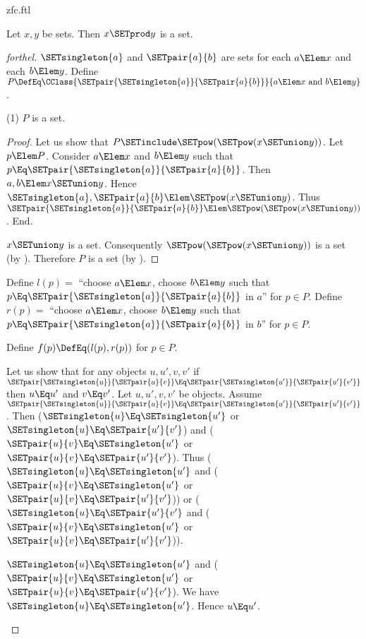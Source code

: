 \documentclass{stex}
\begin{document}
\begin{smodule}{zfc.ftl}
\begin{proposition}[forthel]
  Let $x, y$ be sets.
  Then $x \SETprod y$ is a set.
\end{proposition}
\begin{proof}[forthel]
  $\SETsingleton{a}$ and $\SETpair{a}{b}$ are sets for each $a \Elem x$ and each $b \Elem y$.
  Define $P \DefEq \CClass{\SETpair{\SETsingleton{a}}{\SETpair{a}{b}}}{a \Elem x\text{ and }b \Elem y}$.

  (1) $P$ is a set.
  \begin{proof}
    Let us show that $P \SETinclude \SETpow(\SETpow(x \SETunion y))$.
      Let $p \Elem P$.
      Consider $a \Elem x$ and $b \Elem y$ such that $p \Eq \SETpair{\SETsingleton{a}}{\SETpair{a}{b}}$.
      Then $a, b \Elem x \SETunion y$.
      Hence $\SETsingleton{a}, \SETpair{a}{b} \Elem \SETpow(x \SETunion y)$.
      Thus $\SETpair{\SETsingleton{a}}{\SETpair{a}{b}} \Elem \SETpow(\SETpow(x \SETunion y))$.
    End.

    $x \SETunion y$ is a set.
    Consequently $\SETpow(\SETpow(x \SETunion y))$ is a set (by ).
    Therefore $P$ is a set (by ).
  \end{proof}

  Define $l(p) =$ ``choose $a \Elem x$, choose $b \Elem y$ such that $p \Eq \SETpair{\SETsingleton{a}}{\SETpair{a}{b}}$ in $a$'' for $p \in P$.
  Define $r(p) =$ ``choose $a \Elem x$, choose $b \Elem y$ such that $p \Eq \SETpair{\SETsingleton{a}}{\SETpair{a}{b}}$ in $b$'' for $p \in P$.

  Define $f(p) \DefEq (l(p), r(p))$ for $p \in P$.

  Let us show that for any objects $u, u', v, v'$ if
  $\SETpair{\SETsingleton{u}}{\SETpair{u}{v}} \Eq \SETpair{\SETsingleton{u'}}{\SETpair{u'}{v'}}$ then $u \Eq u'$ and $v \Eq v'$.
    Let $u, u', v, v'$ be objects.
    Assume $\SETpair{\SETsingleton{u}}{\SETpair{u}{v}} \Eq \SETpair{\SETsingleton{u'}}{\SETpair{u'}{v'}}$.
    Then ($\SETsingleton{u} \Eq \SETsingleton{u'}$ or $\SETsingleton{u} \Eq \SETpair{u'}{v'}$) and ($\SETpair{u}{v} \Eq \SETsingleton{u'}$ or $\SETpair{u}{v} \Eq \SETpair{u'}{v'}$).
    Thus ($\SETsingleton{u} \Eq \SETsingleton{u'}$ and ($\SETpair{u}{v} \Eq \SETsingleton{u'}$ or $\SETpair{u}{v} \Eq \SETpair{u'}{v'}$)) or ($\SETsingleton{u} \Eq \SETpair{u'}{v'}$ and ($\SETpair{u}{v} \Eq \SETsingleton{u'}$ or $\SETpair{u}{v} \Eq \SETpair{u'}{v'}$)).

    \begin{case}{$\SETsingleton{u} \Eq \SETsingleton{u'}$ and ($\SETpair{u}{v} \Eq \SETsingleton{u'}$ or $\SETpair{u}{v} \Eq \SETpair{u'}{v'}$).}
      We have $\SETsingleton{u} \Eq \SETsingleton{u'}$.
      Hence $u \Eq u'$.


\end{case}
\end{proof}
\end{smodule}
\end{document}
